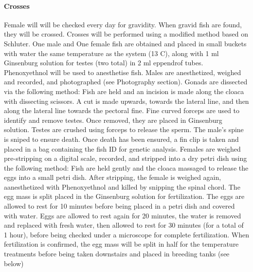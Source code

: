 \documentclass[12pt]{extarticle}
\begin{document}
\paragraph{Crosses}
Female will will be checked every day for gravidity. When gravid fish are found, they will be crossed.
Crosses will be performed using a modified method based on Schluter. One male and One female fish are obtained and placed in small buckets with water the same temperature as the system (13 \degree C), along with 1 ml Ginsenburg solution for testes (two total) in 2 ml eppendrof tubes. Phenoxyethnol will be used to anesthetise fish. Males are anesthetized, weighed and recorded, and photographed (see Photography section). Gonads are dissected via the following method:
Fish are held and an incision is made along the cloaca with dissecting scissors. A cut is made upwards, towards the lateral line, and then along the lateral line towards the pectoral fine. Fine curved forceps are used to identify and remove testes. Once removed, they are placed in Ginsenburg solution.
Testes are crushed using forceps to release the sperm. The male's spine is sniped to ensure death. Once death has been ensured, a fin clip is taken and placed in a bag containing the fish ID for genetic analysis.
Females are weighed pre-stripping on a digital scale, recorded, and stripped into a dry petri dish using the following method:
Fish are held gently and the cloaca massaged to release the eggs into a small petri dish. After stripping, the female is weighed again, aanesthetized with Phenoxyethnol and killed by snipping the spinal chord. The egg mass is split placed in the Ginsenburg solution for fertilization.
 The eggs are allowed to rest for 10 minutes before being placed in a petri dish and covered with water. Eggs are allowed to rest again for 20 minutes, the water is removed and replaced with fresh water, then allowed to rest for 30 minutes (for a total of 1 hour), before being checked under a microscope for complete fertilization. When fertilization is confirmed, the egg mass will be split in half for the temperature treatments before being taken downstairs and placed in breeding tanks (see below)
 
\end{document}
